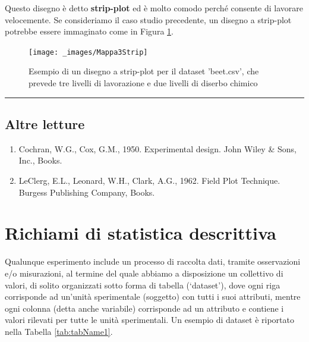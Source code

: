 \documentclass[a4paper,12pt,oneside]{book}
\providecommand{\tightlist}{%
  \setlength{\itemsep}{0pt}\setlength{\parskip}{0pt}}
\begin{document}
Questo disegno è detto \textbf{strip-plot} ed è molto comodo perché consente di lavorare velocemente. Se consideriamo il caso studio precedente, un disegno a strip-plot potrebbe essere immaginato come in Figura \ref{fig:figName253}.

\begin{figure}

{\centering \texttt{[image: \_images/Mappa3Strip]} 

}

\caption{Esempio di un disegno a strip-plot per il dataset 'beet.csv', che prevede tre livelli di lavorazione e due livelli di diserbo chimico}\label{fig:figName253}
\end{figure}

\begin{center}\rule{0.5\linewidth}{0.5pt}\end{center}

\hypertarget{altre-letture-1}{%
\section{Altre letture}\label{altre-letture-1}}

\begin{enumerate}
\def\labelenumi{\arabic{enumi}.}
\tightlist
\item
  Cochran, W.G., Cox, G.M., 1950. Experimental design. John Wiley \& Sons, Inc., Books.
\item
  LeClerg, E.L., Leonard, W.H., Clark, A.G., 1962. Field Plot Technique. Burgess Publishing Company, Books.
\end{enumerate}

\hypertarget{richiami-di-statistica-descrittiva}{%
\chapter{Richiami di statistica descrittiva}\label{richiami-di-statistica-descrittiva}}

Qualunque esperimento include un processo di raccolta dati, tramite osservazioni e/o misurazioni, al termine del quale abbiamo a disposizione un collettivo di valori, di solito organizzati sotto forma di tabella (`dataset'), dove ogni riga corrisponde ad un'unità sperimentale (soggetto) con tutti i suoi attributi, mentre ogni colonna (detta anche variabile) corrisponde ad un attributo e contiene i valori rilevati per tutte le unità sperimentali. Un esempio di dataset è riportato nella Tabella \ref{tab:tabName1}.
\end{document}
